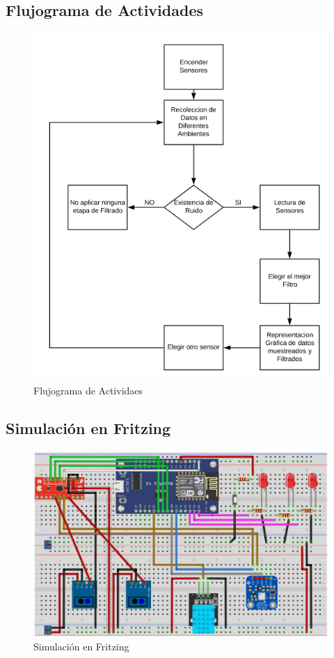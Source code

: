 \documentclass[10pt,a4paper]{article}
\begin{document}
\begin{multicols}{2}
\begin{itemize}
\subsection{Flujograma de Actividades}
\begin{figure}[H]
\centering
\includegraphics[scale=0.75]{flujo.PNG}
\caption{Flujograma de Actividaes}
\end{figure}

\subsection{Simulación en Fritzing}
\begin{figure}[H]
\centering
\includegraphics[scale=0.35]{frit.PNG}
\caption{Simulación en Fritzing}
\end{figure}


\end{itemize}
\end{multicols}
\end{document}
